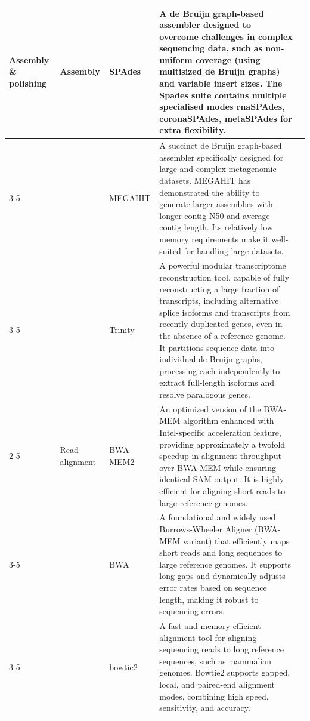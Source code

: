 \begin{longtable}{p{2cm}p{1.8cm}p{1.8cm}p{8.3cm}p{1cm}}
Assembly \& polishing & Assembly & SPAdes & A de Bruijn graph-based assembler designed to overcome challenges in complex sequencing data, such as non-uniform coverage (using multisized de Bruijn graphs) and variable insert sizes. The Spades suite contains multiple specialised modes rnaSPAdes, coronaSPAdes, metaSPAdes for extra flexibility. & \citep{Meleshko2021-gb} \\
\cmidrule{3-5}
 &  & MEGAHIT & A succinct de Bruijn graph-based assembler specifically designed for large and complex metagenomic datasets. MEGAHIT has demonstrated the ability to generate larger assemblies with longer contig N50 and average contig length. Its relatively low memory requirements make it well-suited for handling large datasets. & \citep{Li2016-sd} \\
\cmidrule{3-5}
 &  & Trinity & A powerful modular transcriptome reconstruction tool, capable of fully reconstructing a large fraction of transcripts, including alternative splice isoforms and transcripts from recently duplicated genes, even in the absence of a reference genome. It partitions sequence data into individual de Bruijn graphs, processing each independently to extract full-length isoforms and resolve paralogous genes. & \citep{Grabherr2011-ef} \\
\cmidrule{2-5}
 & Read alignment & BWA-MEM2 & An optimized version of the BWA-MEM algorithm enhanced with Intel-specific acceleration feature, providing approximately a twofold speedup in alignment throughput over BWA-MEM while ensuring identical SAM output. It is highly efficient for aligning short reads to large reference genomes. & \citep{Vasimuddin2019-rb} \\
\cmidrule{3-5}
 &  & BWA & A foundational and widely used Burrows-Wheeler Aligner (BWA-MEM variant) that efficiently maps short reads and long sequences to large reference genomes. It supports long gaps and dynamically adjusts error rates based on sequence length, making it robust to sequencing errors. & \citep{Li2013-pp} \\
\cmidrule{3-5}
 &  & bowtie2 & A fast and memory-efficient alignment tool for aligning sequencing reads to long reference sequences, such as mammalian genomes. Bowtie2 supports gapped, local, and paired-end alignment modes, combining high speed, sensitivity, and accuracy. & \citep{Langmead2019-wx} \\
\midrule


\end{longtable}
